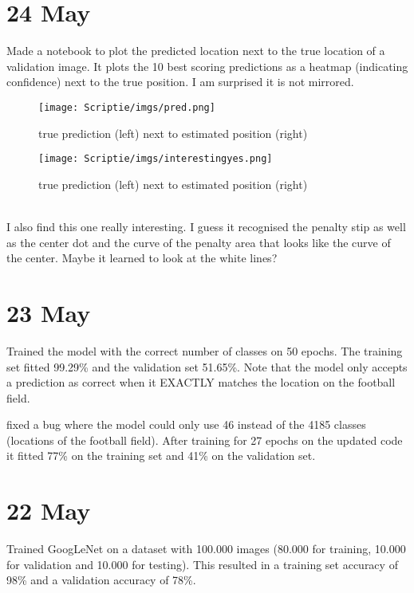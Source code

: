 \documentclass[twoside]{report}
\begin{document}
\section*{24 May}
Made a notebook to plot the predicted location next to the true location of a validation image. It plots the 10 best scoring predictions as a heatmap (indicating confidence) next to the true position. I am surprised it is not mirrored.
\begin{figure}[!h]
\begin{centering}
\texttt{[image: Scriptie/imgs/pred.png]}
\caption{true prediction (left) next to estimated position (right)}
\end{centering}
\end{figure}
\begin{figure}[!h]
\begin{centering}
\texttt{[image: Scriptie/imgs/interestingyes.png]}
\caption{true prediction (left) next to estimated position (right)}
\end{centering}
\end{figure}
\hfill \break \\
I also find this one really interesting. I guess it recognised the penalty stip as well as the center dot and the curve of the penalty area that looks like the curve of the center. Maybe it learned to look at the white lines?

\section*{23 May}
Trained the model with the correct number of classes on 50 epochs. The training set fitted 99.29\% and the validation set 51.65\%.  Note that the model only accepts a prediction as correct when it EXACTLY matches the location on the football field.

fixed a bug where the model could only use 46 instead of the 4185 classes (locations of the football field). After training for 27 epochs on the updated code it fitted 77\% on the training set and 41\% on the validation set. 


\section*{22 May}
Trained GoogLeNet on a dataset with 100.000 images (80.000 for training, 10.000 for validation and 10.000 for testing). This resulted in a training set accuracy of 98\% and a validation accuracy of 78\%.
\end{document}
